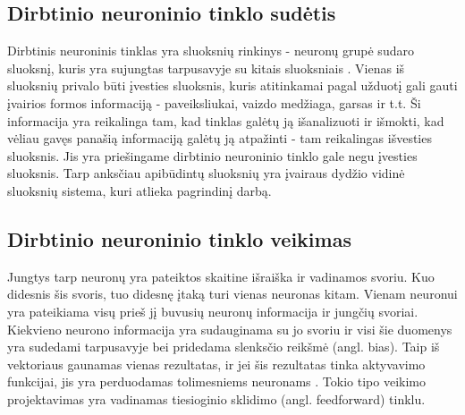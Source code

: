 \documentclass{VUMIFPSbakalaurinis}
\begin{document}
\subsection{Dirbtinio neuroninio tinklo sudėtis}
Dirbtinis neuroninis tinklas yra sluoksnių rinkinys - neuronų grupė sudaro sluoksnį, kuris yra sujungtas tarpusavyje su kitais sluoksniais \cite{1193152}. Vienas iš
sluoksnių privalo būti įvesties sluoksnis, kuris atitinkamai pagal užduotį gali gauti įvairios formos informaciją - paveiksliukai, vaizdo
medžiaga, garsas ir t.t. Ši informacija yra reikalinga tam, kad tinklas galėtų ją išanalizuoti ir išmokti, kad vėliau gavęs panašią
informaciją galėtų ją atpažinti - tam reikalingas išvesties sluoksnis. Jis yra priešingame dirbtinio neuroninio tinklo gale negu įvesties sluoksnis.
Tarp anksčiau apibūdintų sluoksnių yra įvairaus dydžio vidinė sluoksnių sistema, kuri atlieka pagrindinį darbą.

\subsection{Dirbtinio neuroninio tinklo veikimas}
Jungtys tarp neuronų yra pateiktos skaitine išraiška ir vadinamos svoriu. Kuo didesnis šis svoris, tuo didesnę įtaką turi vienas neuronas kitam.
Vienam neuronui yra pateikiama visų prieš jį buvusių neuronų informacija ir jungčių svoriai. Kiekvieno neurono informacija yra sudauginama su
jo svoriu ir visi šie duomenys yra sudedami tarpusavyje bei pridedama slenksčio reikšmė (angl. bias). Taip iš vektoriaus gaunamas vienas rezultatas, ir jei šis rezultatas tinka aktyvavimo
funkcijai, jis yra perduodamas tolimesniems neuronams \cite{shiffman2012nature}. Tokio tipo veikimo projektavimas yra vadinamas tiesioginio sklidimo (angl. feedforward) tinklu.
\end{document}
